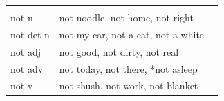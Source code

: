 \documentclass[man]{apa6}
\begin{document}
\begin{longtable}[]{@{}lll@{}}
\begin{minipage}[t]{0.27\columnwidth}
\strut
\end{minipage}\tabularnewline
\begin{minipage}[t]{0.21\columnwidth}\raggedright\strut
not n\strut
\end{minipage} & \begin{minipage}[t]{0.43\columnwidth}\raggedright\strut
not noodle, not home, not right\strut
\end{minipage} & \begin{minipage}[t]{0.27\columnwidth}\raggedright\strut
\strut
\end{minipage}\tabularnewline
\begin{minipage}[t]{0.21\columnwidth}\raggedright\strut
not det n\strut
\end{minipage} & \begin{minipage}[t]{0.43\columnwidth}\raggedright\strut
not my car, not a cat, not a white\strut
\end{minipage} & \begin{minipage}[t]{0.27\columnwidth}\raggedright\strut
\strut
\end{minipage}\tabularnewline
\begin{minipage}[t]{0.21\columnwidth}\raggedright\strut
not adj\strut
\end{minipage} & \begin{minipage}[t]{0.43\columnwidth}\raggedright\strut
not good, not dirty, not real\strut
\end{minipage} & \begin{minipage}[t]{0.27\columnwidth}\raggedright\strut
\strut
\end{minipage}\tabularnewline
\begin{minipage}[t]{0.21\columnwidth}\raggedright\strut
not adv\strut
\end{minipage} & \begin{minipage}[t]{0.43\columnwidth}\raggedright\strut
not today, not there, *not asleep\strut
\end{minipage} & \begin{minipage}[t]{0.27\columnwidth}\raggedright\strut
\strut
\end{minipage}\tabularnewline
\begin{minipage}[t]{0.21\columnwidth}\raggedright\strut
not v\strut
\end{minipage} & \begin{minipage}[t]{0.43\columnwidth}\raggedright\strut
not shush, not work, not blanket\strut
\end{minipage} & \begin{minipage}[t]{0.27\columnwidth}\raggedright\strut

\end{minipage}
\end{longtable}
\end{document}
